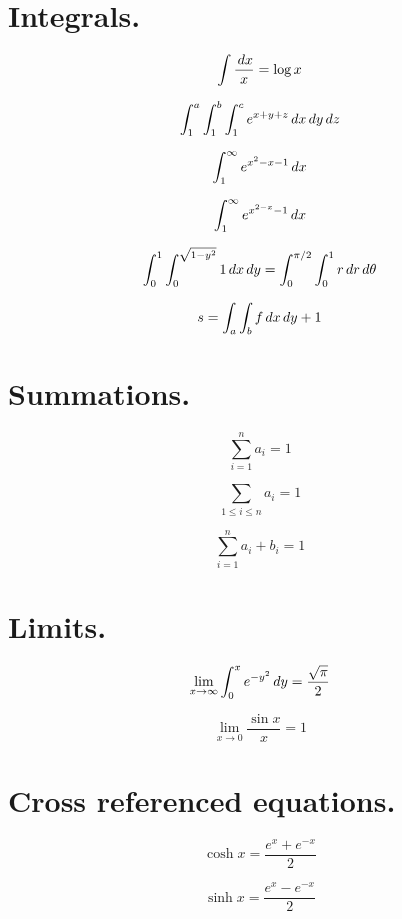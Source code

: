 
\section{Integrals. }


$$\int\frac{\,dx}{x} =\log x$$

$$\int_1^a \int_1^b\int_1^c e^{x+y+z}\,dx\,dy\,dz$$

$$\int_1^\infty e^{x^2-x-1}\,dx$$

$$\int_1^\infty e^{x^{2-x}-1}\,dx$$

$$\int_0^1\int_0^{\sqrt{1 -y^2}}1\,dx\,dy= \int_0^{\pi/2}\int_0^1
r\,dr\,d\theta$$

$$s=\int_a \int_b f \,dx\,dy+1$$



\section{Summations. }

$$\sum_{i=1}^n a_i =1$$

$$\sum_{1\leq i\leq n}a_i =1$$

$$\sum_{i=1}^n a_i + b_i = 1$$



\section{Limits. }

$$\lim_{x \to \infty}\int_0^x e^{-y^2}\,dy = \frac{\sqrt{\pi}}{2}$$

$$\lim_{x\to 0}\frac{\sin x}{x} =1$$



\section{Cross referenced equations. }

\begin{equation}
\cosh x = \frac{e^x + e^{-x} }{2} \label{eq:cosh}
\end{equation}

\begin{equation}
\sinh x = \frac{e^x-e^{-x}}{2} \label{eq:sinh}
\end{equation}

